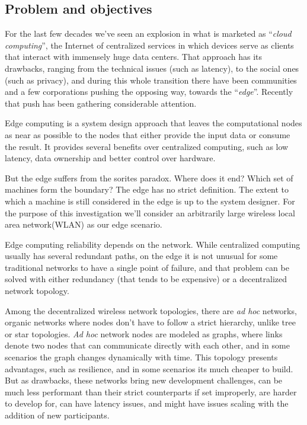 \documentclass[runningheads]{llncs}
\begin{document}
\subsection*{Problem and objectives}
For the last few decades we've seen an explosion in what is marketed as ``\textit{cloud computing}'', the Internet of centralized services in which devices serve as clients that interact with immensely huge data centers.
That approach has its drawbacks, ranging from the technical issues (such as latency), to the social ones (such as privacy), and during this whole transition there have been communities and a few corporations pushing the opposing way, towards the ``\textit{edge}''. Recently that push has been gathering considerable attention.
\par Edge computing is a system design approach that leaves the computational nodes as near as possible to the nodes that either provide the input data or consume the result.
It provides several benefits over centralized computing, such as low latency, data ownership and better control over hardware.
\par But the edge suffers from the sorites paradox. Where does it end? Which set of machines form the boundary?
The edge has no strict definition. The extent to which a machine is still considered in the edge is up to the system designer. For the purpose of this investigation we'll consider an arbitrarily large wireless local area network(WLAN) as our edge scenario.
\par Edge computing reliability depends on the network. While centralized computing usually has several redundant paths, on the edge it is not unusual for some traditional networks to have a single point of failure, and that problem can be solved with either redundancy (that tends to be expensive) or a decentralized network topology.
\par Among the decentralized wireless network topologies, there are \textit{ad hoc} networks, organic networks where nodes don't have to follow a strict hierarchy, unlike tree or star topologies.
\textit{Ad hoc} network nodes are modeled as graphs, where links denote two nodes that can communicate directly with each other, and in some scenarios the graph changes dynamically with time.\cite{Akos:2018}
This topology presents advantages, such as resilience, and in some scenarios its much cheaper to build. But as drawbacks, these networks bring new development challenges, can be much less performant than their strict counterparts if set improperly, are harder to develop for, can have latency issues, and might have issues scaling with the addition of new participants.
\end{document}
